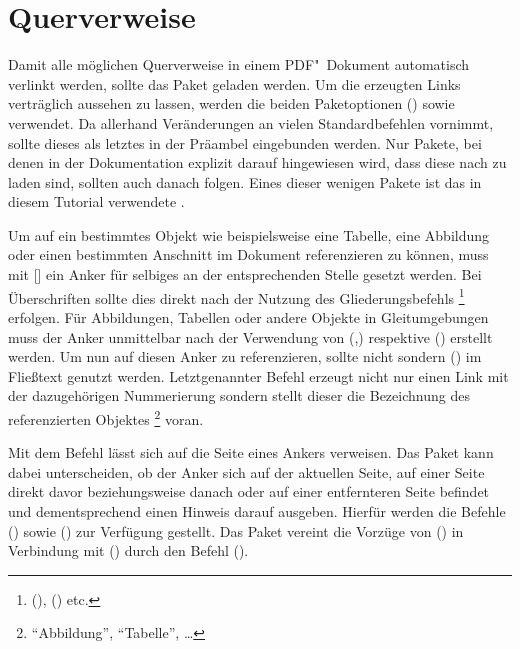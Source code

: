 \documentclass[%
  english,ngerman,%
  cdgeometry=no,DIV=12,%
  cd=false,cdfont=false,cdtitle=true,%
  headings=normal,%
  automark,%
  listof=toc,%
]{tudscrartcl}
\begin{document}
\section{Querverweise}
\label{sec:references}%
%
Damit alle möglichen Querverweise in einem PDF"~Dokument automatisch verlinkt 
werden, sollte das Paket  geladen werden. Um die erzeugten 
Links verträglich aussehen zu lassen, werden die beiden Paketoptionen 
() sowie  
verwendet. Da  allerhand Veränderungen an vielen 
Standardbefehlen vornimmt, sollte dieses als letztes in der Präambel 
eingebunden werden. Nur Pakete, bei denen in der Dokumentation explizit darauf 
hingewiesen wird, dass diese nach  zu laden sind, sollten 
auch danach folgen. Eines dieser wenigen Pakete ist das in diesem Tutorial 
verwendete . 
%
\begin{Hint}
\usepackage[colorlinks,linkcolor=blue]{hyperref}

\end{Hint}
%
Um auf ein bestimmtes Objekt wie beispielsweise eine Tabelle, eine Abbildung 
oder einen bestimmten Anschnitt im Dokument referenzieren zu können, muss mit 
[] ein Anker für selbiges an der entsprechenden 
Stelle gesetzt werden. Bei Überschriften sollte dies direkt nach der Nutzung 
des Gliederungsbefehls%
\footnote{%
  (), 
  () etc.%
}
erfolgen. Für Abbildungen, Tabellen oder andere Objekte in Gleitumgebungen muss 
der Anker unmittelbar nach der Verwendung von 
(,) respektive 
() erstellt werden. Um nun auf diesen 
Anker zu referenzieren, sollte nicht  sondern 
() im Fließtext genutzt werden. Letztgenannter 
Befehl erzeugt nicht nur einen Link mit der dazugehörigen Nummerierung sondern 
stellt dieser die Bezeichnung des referenzierten Objektes%
\footnote{\enquote{Abbildung}, \enquote{Tabelle}, \dots}
voran. 

Mit dem Befehl  lässt sich auf die Seite eines Ankers verweisen. 
Das Paket  kann dabei unterscheiden, ob der Anker sich auf 
der aktuellen Seite, auf einer Seite direkt davor beziehungsweise danach oder 
auf einer entfernteren Seite befindet und dementsprechend einen Hinweis darauf 
ausgeben. Hierfür werden die Befehle () sowie 
() zur Verfügung gestellt. Das Paket 
 vereint die Vorzüge von () 
in Verbindung mit () durch den Befehl 
().
\end{document}
